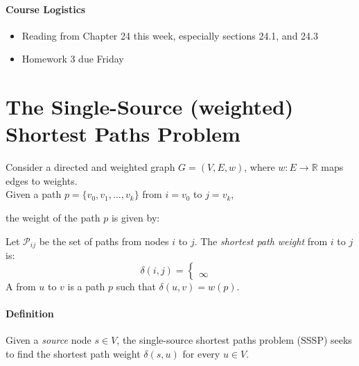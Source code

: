 \documentclass[11  pt]{exam}
\begin{document}
	
	
	\paragraph{Course Logistics}
	\begin{itemize}
		\item Reading from Chapter 24 this week, especially sections 24.1, and 24.3
		\item Homework 3 due Friday
	\end{itemize}
	
	\section{The Single-Source (weighted) Shortest Paths Problem}
	Consider a directed and weighted graph $G = (V,E, w)$, where $w \colon E \rightarrow \mathbb{R}$ maps edges to weights.\\
	
	Given a path $p = \{v_0, v_1, \hdots , v_k\}$ from $i = v_0$ to $j = v_k$, 
	
	\vs{2.5cm}
	
	
	the weight of the path $p$ is given by: 
\vs{3cm}
	
	Let $\mathcal{P}_{ij}$ be the set of paths from nodes $i$ to $j$. The \emph{shortest path weight} from $i$ to $j$ is:
	\begin{equation*}
		\delta(i,j) = \begin{cases}
		 \\  \\%
			\infty & %
		\end{cases}
	\end{equation*}
	A  from $u$ to $v$ is a path $p$ such that $\delta(u,v) = w(p)$. \\
	
	\paragraph{Definition} Given a \emph{source} node $s \in V$, the single-source shortest paths problem (SSSP) seeks to find the shortest path weight $\delta(s,u)$ for every $u \in V$.
	
\end{document}
